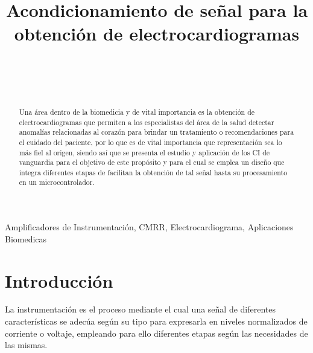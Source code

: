 \documentclass[conference]{IEEEtran}
\begin{document}
	
	\title{Acondicionamiento de señal para la obtención de electrocardiogramas}
	\author{
		\\
		\\
		\\
		\and
		\and
	}
	
	\maketitle
	\begin{abstract}
	Una área dentro de la biomedicia y de vital importancia es la obtención de electrocardiogramas que permiten a los especialistas del área de la salud detectar anomalías relacionadas al corazón para brindar un tratamiento o recomendaciones para el cuidado del paciente, por lo que es de vital importancia que representación sea lo más fiel al origen, siendo así que se presenta el estudio y aplicación de los CI de vanguardia para el objetivo de este propósito y para el cual se emplea un diseño que integra diferentes etapas de facilitan la obtención de tal señal hasta su procesamiento en un microcontrolador.
	\end{abstract}
	
	\begin{IEEEkeywords}
		Amplificadores de Instrumentación, CMRR, Electrocardiograma, Aplicaciones Biomedicas 
	\end{IEEEkeywords}
	
	\section{Introducción}
	
	La instrumentación es el proceso mediante el cual una señal de diferentes características se adecúa según su tipo para expresarla en niveles normalizados de corriente o voltaje, empleando para ello diferentes etapas según las necesidades de las mismas.
	
\end{document}
